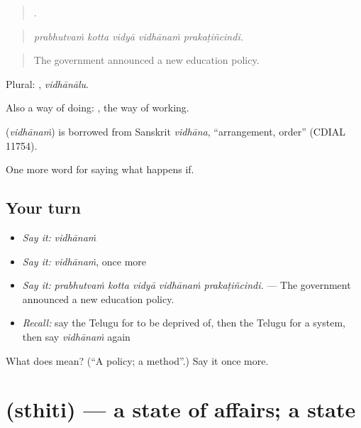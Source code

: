 \begin{quote}
    .
\end{quote}

\begin{quote}
\emph{prabhutvaṁ kotta vidyā vidhānaṁ prakaṭiñcindi.}
\end{quote}

\begin{quote}
The government announced a new education policy.
\end{quote}

Plural: , \emph{vidhānālu}.

Also a way of doing:   , the way of working.

\begin{cousinweb}
\textbf{} (\emph{vidhānaṁ}) is borrowed from Sanskrit \emph{vidhāna}, \textquotedblleft{}arrangement, order\textquotedblright{} (CDIAL 11754).
\end{cousinweb}

\begin{grammarlens}[title={What you've built}]
One more word for saying what happens if.
\end{grammarlens}

\subsection*{Your turn}
\begin{itemize}
\raggedright
  \item \emph{Say it:} \emph{vidhānaṁ}
  \item \emph{Say it:} \emph{vidhānaṁ}, once more
  \item \emph{Say it:} \emph{prabhutvaṁ kotta vidyā vidhānaṁ prakaṭiñcindi.} — The government announced a new education policy.
  \item \emph{Recall:} say the Telugu for to be deprived of, then the Telugu for a system, then say \emph{vidhānaṁ} again
\end{itemize}

\begin{tcolorbox}[breakable,colback=teal!4,colframe=teal!35!black,title={Before you move on}]
What does  mean? (\textquotedblleft{}A policy; a method\textquotedblright{}.) Say it once more.
\end{tcolorbox}
\section[\texorpdfstring{\te{స్థితి} (sthiti)}{స్థితి (sthiti)}]{ (sthiti) — a state of affairs; a state}


